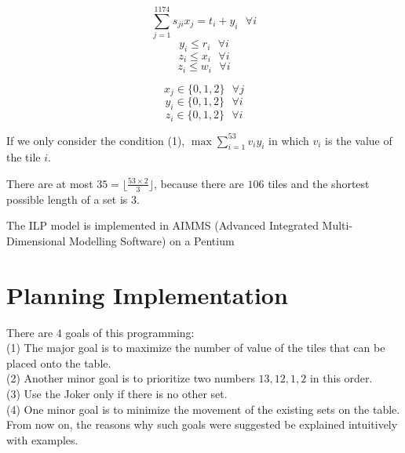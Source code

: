 \documentclass[11pt]{article}
\begin{document}
	\[\sum_{j=1}^{1174}s_{ji}x_j=t_i+y_i\text{ } \forall i\]
	\[y_i\leq r_i\text{ } \forall i\]
	\[z_i\leq x_i\text{ } \forall i\]
	\[z_i\leq w_i\text{ } \forall i\]

	\[x_j\in\{0,1,2\}\text{ } \forall j\]
	\[y_i\in\{0,1,2\}\text{ } \forall i\]
	\[z_i\in\{0,1,2\}\text{ } \forall i\]
	
	If we only consider the condition (1), $\max\sum_{i=1}^{53}v_iy_i$ in which $v_i$ is the value of the tile $i$.
	
	
	
	
	There are at most $35 = \lfloor \frac{53\times2}{3} \rfloor$, because there are $106$ tiles and the shortest possible length of a set is $3$. 
	
	
	
	
	The ILP model is implemented in AIMMS (Advanced Integrated Multi-Dimensional Modelling Software) on a Pentium \uppercase\expandafter{}
	
	




%


	\section{Planning Implementation}\label{section-imp}
	
	
	There are $4$ goals of this programming:\\
	(1) The major goal is to maximize the number of value of the tiles that can be placed onto the table.\\
	(2) Another minor goal is to prioritize two numbers $13,12,1,2$ in this order.\\
	(3) Use the Joker only if there is no other set.\\ %
	(4) One minor goal is to minimize the movement of the existing sets on the table.\\

	
	From now on, the reasons why such goals were suggested be explained intuitively with examples.
	
\end{document}
